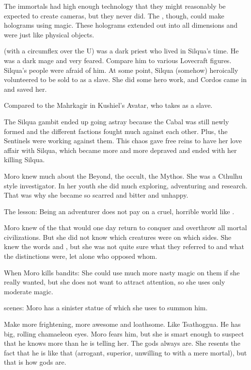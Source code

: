 The immortals had high enough technology that they might reasonably be expected to create cameras, but they never did. 
The \ophidians, though, could make holograms using magic. 
These holograms extended out into all dimensions and were just like physical objects. 



\Byakun (with a circumflex over the U) was a dark priest who lived in Silqua's time. 
He was a dark mage and very feared. 
Compare him to various Lovecraft figures. 
Silqua's people were afraid of him. 
At some point, Silqua (somehow) heroically volunteered to be sold to \Byakun as a slave. 
She did some hero work, and Cordos came in and saved her. 

Compared to the Mahrkagir in Kushiel's Avatar, who takes \Phedre as a slave. 



The Silqua gambit ended up going astray because the Cabal was still newly formed and the different factions fought much against each other. 
Plus, the Sentinels were working against them. 
This chaos gave \Delphine free reins to have her love affair with Silqua, which became more and more depraved and ended with her killing Silqua. 



Moro \Cornel knew much about the Beyond, the occult, the \Miith Mythos. 
She was a Cthulhu style investigator. 
In her youth she did much exploring, adventuring and research. 
That was why she became so scarred and bitter and unhappy. 

The lesson: Being an adventurer does not pay on a cruel, horrible world like \Miith.

Moro knew of the  that would one day return to conquer \Miith and overthrow all mortal civilizations. 
But she did not know which creatures were on which sides. 
She knew the words \quo{\xs} and \quo{\bane}, but she was not quite sure what they referred to and what the distinctions were, let alone who opposed whom. 

When Moro kills bandits:
  She could use much more nasty magic on them if she really wanted, but she does not want to attract attention, so she uses only moderate magic. 

\Nasshikerr scenes:
  Moro has a sinister statue of \Nasshikerr which she uses to summon him.

  Make \Nasshikerr more frightening, more awesome and loathsome.
  Like Tsathoggua.
  He has big, rolling chamaeleon eyes. 
  Moro fears him, but she is smart enough to suspect that he knows more than he is telling her. 
  The gods always are. 
  She resents the fact that he is like that (arrogant, superior, unwilling to \cooperate with a mere mortal), but that is how gods are.




